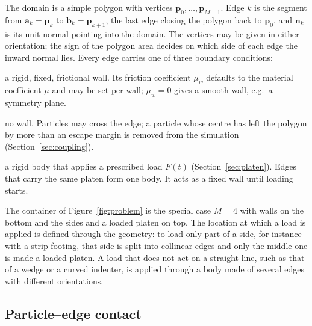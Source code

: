 The domain is a simple polygon with vertices
$\mathbf{p}_{0},\dots,\mathbf{p}_{M-1}$.  Edge $k$ is the segment from
$\mathbf{a}_{k}=\mathbf{p}_{k}$ to $\mathbf{b}_{k}=\mathbf{p}_{k+1}$, the last
edge closing the polygon back to $\mathbf{p}_{0}$, and $\mathbf{n}_{k}$ is its
unit normal pointing into the domain.  The vertices may be given in either
orientation; the sign of the polygon area decides on which side of each edge the
inward normal lies.  Every edge carries one of three boundary conditions:
\begin{description}[leftmargin=1.6em,style=nextline]
  \item[Wall] a rigid, fixed, frictional wall.  Its friction coefficient
        $\mu_{w}$ defaults to the material coefficient $\mu$ and may be set per
        wall; $\mu_{w}=0$ gives a smooth wall, e.g.\ a symmetry plane.
  \item[Open] no wall.  Particles may cross the edge; a particle whose centre
        has left the polygon by more than an escape margin is removed from the
        simulation (Section~\ref{sec:coupling}).
  \item[Loaded platen] a rigid body that applies a prescribed load $F(t)$
        (Section~\ref{sec:platen}).  Edges that carry the same platen form one
        body.  It acts as a fixed wall until loading starts.
\end{description}
The container of Figure~\ref{fig:problem} is the special case $M=4$ with walls
on the bottom and the sides and a loaded platen on top.  The location at which a
load is applied is defined through the geometry: to load only part of a side,
for instance with a strip footing, that side is split into collinear edges and
only the middle one is made a loaded platen.  A load that does not act on a
straight line, such as that of a wedge or a curved indenter, is applied through
a body made of several edges with different orientations.

\subsection{Particle--edge contact}

